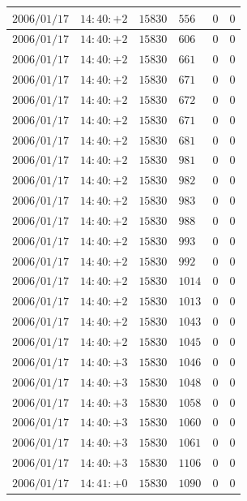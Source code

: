\documentclass[a4j,papersize,disablejfam,slide,14pt]{jsarticle}
\begin{document}
\begin{description}
\begin{center}
\begin{longtable}{|l|l|l|l|l|l|}
					$2006/01/17$ & $14:40:+2$  & $15830$ & $556$ & $0$ & $0$ \\ \hline
					$2006/01/17$ & $14:40:+2$  & $15830$ & $606$ & $0$ & $0$ \\ \hline
					$2006/01/17$ & $14:40:+2$  & $15830$ & $661$ & $0$ & $0$ \\ \hline
					$2006/01/17$ & $14:40:+2$  & $15830$ & $671$ & $0$ & $0$ \\ \hline
					$2006/01/17$ & $14:40:+2$  & $15830$ & $672$ & $0$ & $0$ \\ \hline
					$2006/01/17$ & $14:40:+2$  & $15830$ & $671$ & $0$ & $0$ \\ \hline
					$2006/01/17$ & $14:40:+2$  & $15830$ & $681$ & $0$ & $0$ \\ \hline
					$2006/01/17$ & $14:40:+2$  & $15830$ & $981$ & $0$ & $0$ \\ \hline
					$2006/01/17$ & $14:40:+2$  & $15830$ & $982$ & $0$ & $0$ \\ \hline
					$2006/01/17$ & $14:40:+2$  & $15830$ & $983$ & $0$ & $0$ \\ \hline
					$2006/01/17$ & $14:40:+2$  & $15830$ & $988$ & $0$ & $0$ \\ \hline
					$2006/01/17$ & $14:40:+2$  & $15830$ & $993$ & $0$ & $0$ \\ \hline
					$2006/01/17$ & $14:40:+2$  & $15830$ & $992$ & $0$ & $0$ \\ \hline
					$2006/01/17$ & $14:40:+2$  & $15830$ & $1014$ & $0$ & $0$ \\ \hline
					$2006/01/17$ & $14:40:+2$  & $15830$ & $1013$ & $0$ & $0$ \\ \hline
					$2006/01/17$ & $14:40:+2$  & $15830$ & $1043$ & $0$ & $0$ \\ \hline
					$2006/01/17$ & $14:40:+2$  & $15830$ & $1045$ & $0$ & $0$ \\ \hline
					$2006/01/17$ & $14:40:+3$  & $15830$ & $1046$ & $0$ & $0$ \\ \hline
					$2006/01/17$ & $14:40:+3$  & $15830$ & $1048$ & $0$ & $0$ \\ \hline
					$2006/01/17$ & $14:40:+3$  & $15830$ & $1058$ & $0$ & $0$ \\ \hline
					$2006/01/17$ & $14:40:+3$  & $15830$ & $1060$ & $0$ & $0$ \\ \hline
					$2006/01/17$ & $14:40:+3$  & $15830$ & $1061$ & $0$ & $0$ \\ \hline
					$2006/01/17$ & $14:40:+3$  & $15830$ & $1106$ & $0$ & $0$ \\ \hline
					$2006/01/17$ & $14:41:+0$  & $15830$ & $1090$ & $0$ & $0$ \\ \hline

\end{longtable}
\end{center}
\end{description}
\end{document}
